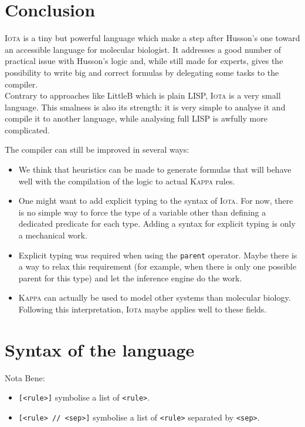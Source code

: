 \documentclass[10pt,a4paper]{article}
\newcommand\Iota{\textsc{Iota}}
\newcommand\Kappa{\textsc{Kappa}}
\newcommand{\ocaml}{\texttt}
\begin{document}
\section{Conclusion}
\Iota{} is a tiny but powerful language which make a step after Husson's one toward an accessible language for molecular biologist. It addresses a good number of practical issue with Husson's logic and, while still made for experts, gives the possibility to write big and correct formulas by delegating some tasks to the compiler.\\

Contrary to approaches like LittleB \cite{littleb} which is plain LISP, \Iota{} is a very small language. This smalness is also its strength: it is very simple to analyse it and compile it to another language, while analysing full LISP is awfully more complicated.

The compiler can still be improved in several ways:
\begin{itemize}
\item We think that heuristics can be made to generate formulas that will behave well with the compilation of the logic to actual \Kappa{} rules.
\item One might want to add explicit typing to the syntax of \Iota{}. For now, there is no simple way to force the type of a variable other than defining a dedicated predicate for each type. Adding a syntax for explicit typing is only a mechanical work.
\item Explicit typing was required when using the \ocaml{parent} operator. Maybe there is a way to relax this requirement (for example, when there is only one possible parent for this type) and let the inference engine do the work.
\item \Kappa{} can actually be used to model other systems than molecular biology. Following this interpretation, \Iota{} maybe applies well to these fields.
\end{itemize}

\section{Syntax of the language}
Nota Bene:
\begin{itemize}
\item \verb|[<rule>]| symbolise a list of \verb|<rule>|.
\item \verb|[<rule> // <sep>]| symbolise a list of \verb|<rule>| separated by \verb|<sep>|.
\end{itemize}
\end{document}
